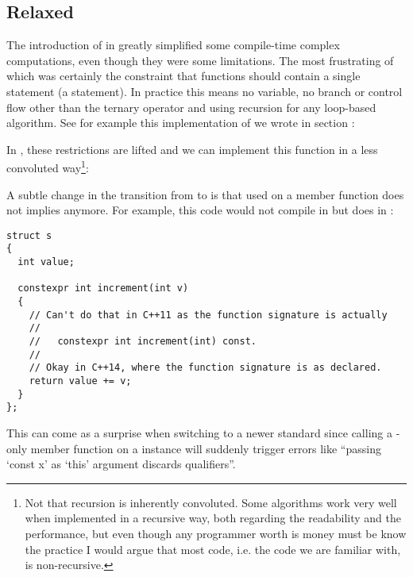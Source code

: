 \subsection{Relaxed }

\problemtitle

The introduction of  in  
greatly simplified some compile-time complex computations, even though
they were some limitations. The most frustrating of which was
certainly the constraint that  functions should
contain a single statement (a  statement). In practice
this means no variable, no branch or control flow other than the
ternary  operator and using recursion for any loop-based
algorithm. See for example this implementation of  we
wrote in section :



\solutiontitle

In , these restrictions are lifted and we can implement this
function in a less convoluted way\footnote{Not that recursion is
inherently convoluted. Some algorithms work very well when
implemented in a recursive way, both regarding the readability and the
performance, but even though any programmer worth is money must be
know the practice I would argue that most code, i.e. the code we are
familiar with, is non-recursive.}:



A subtle change in the transition from  to  is that
 used on a member function does not implies
 anymore. For example, this code would not compile in
 but does in :

\begin{lstlisting}
struct s
{
  int value;

  constexpr int increment(int v)
  {
    // Can't do that in C++11 as the function signature is actually
    //
    //   constexpr int increment(int) const.
    //
    // Okay in C++14, where the function signature is as declared.
    return value += v;
  }
};
\end{lstlisting}

This can come as a surprise when switching to a newer standard since
calling a -only member function on a 
instance will suddenly trigger errors like ``passing ‘const x’ as
‘this’ argument discards qualifiers''.
